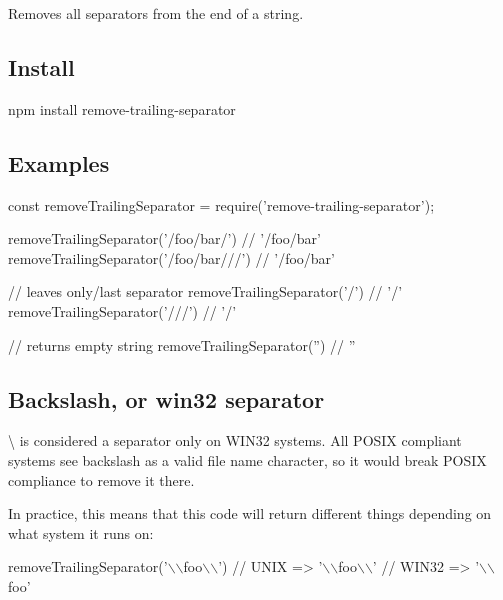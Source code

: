 \href{https://npmjs.org/package/remove-trailing-separator}{\tt } \href{https://travis-ci.org/darsain/remove-trailing-separator}{\tt } \href{https://ci.appveyor.com/project/darsain/remove-trailing-separator/branch/master}{\tt } \href{https://coveralls.io/github/darsain/remove-trailing-separator?branch=master}{\tt }

Removes all separators from the end of a string.

\subsection*{Install}


\begin{DoxyCode}
npm install remove-trailing-separator
\end{DoxyCode}


\subsection*{Examples}


\begin{DoxyCode}
const removeTrailingSeparator = require('remove-trailing-separator');

removeTrailingSeparator('/foo/bar/')   // '/foo/bar'
removeTrailingSeparator('/foo/bar///') // '/foo/bar'

// leaves only/last separator
removeTrailingSeparator('/')    // '/'
removeTrailingSeparator('///')  // '/'

// returns empty string
removeTrailingSeparator('') // ''
\end{DoxyCode}


\subsection*{Backslash, or win32 separator}

{\ttfamily \textbackslash{}} is considered a separator only on W\+I\+N32 systems. All P\+O\+S\+IX compliant systems see backslash as a valid file name character, so it would break P\+O\+S\+IX compliance to remove it there.

In practice, this means that this code will return different things depending on what system it runs on\+:


\begin{DoxyCode}
removeTrailingSeparator('\(\backslash\)\(\backslash\)foo\(\backslash\)\(\backslash\)')
// UNIX  => '\(\backslash\)\(\backslash\)foo\(\backslash\)\(\backslash\)'
// WIN32 => '\(\backslash\)\(\backslash\)foo'
\end{DoxyCode}
 